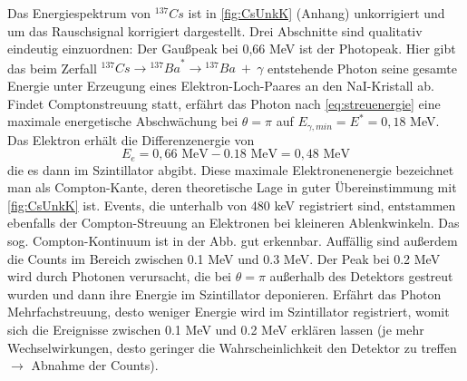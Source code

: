 \documentclass[aps,twocolumn,secnumarabic,nobalancelastpage,amsmath,amssymb,
nofootinbib,superscriptaddress]{revtex4-1}
\begin{document}
\vspace{1em}\noindent Das Energiespektrum von $^{137}Cs$ ist in \cref{fig:CsUnkK} (Anhang) unkorrigiert und um das Rauschsignal korrigiert dargestellt. Drei Abschnitte sind
qualitativ eindeutig einzuordnen:
Der Gaußpeak bei 0,66 MeV ist der Photopeak. Hier gibt das beim Zerfall $^{137}Cs\rightarrow {^{137}Ba}^*\rightarrow {^{137}Ba} \: + \: \gamma$ entstehende Photon seine
gesamte Energie unter Erzeugung eines Elektron-Loch-Paares an den NaI-Kristall ab.
Findet Comptonstreuung statt, erfährt das Photon nach \cref{eq:streuenergie} eine maximale energetische Abschwächung bei $\theta=\pi$ auf
$E_{\gamma,min}=E^*=0,18$ MeV. Das Elektron erhält die Differenzenergie von
\begin{equation*}
  E_e=0,66\text{ MeV} - 0.18\text{ MeV} = 0,48\text{ MeV}
\end{equation*}
die es dann im Szintillator abgibt. Diese maximale Elektronenenergie
bezeichnet man als Compton-Kante, deren theoretische Lage in guter Übereinstimmung mit \cref{fig:CsUnkK} ist.
Events, die unterhalb von 480 keV registriert sind, entstammen ebenfalls der Compton-Streuung an Elektronen bei kleineren Ablenkwinkeln. Das sog. Compton-Kontinuum
ist in der Abb. gut erkennbar.
Auffällig sind außerdem die Counts im Bereich zwischen 0.1 MeV und 0.3 MeV. Der Peak bei 0.2 MeV wird durch Photonen verursacht, die bei $\theta=\pi$ außerhalb des
Detektors gestreut wurden und dann ihre Energie im Szintillator deponieren. Erfährt das Photon Mehrfachstreuung, desto weniger Energie wird im Szintillator registriert,
womit sich die Ereignisse zwischen 0.1 MeV und 0.2 MeV erklären lassen (je mehr Wechselwirkungen, desto geringer die Wahrscheinlichkeit den Detektor zu treffen $\rightarrow$ Abnahme der Counts).
\end{document}
